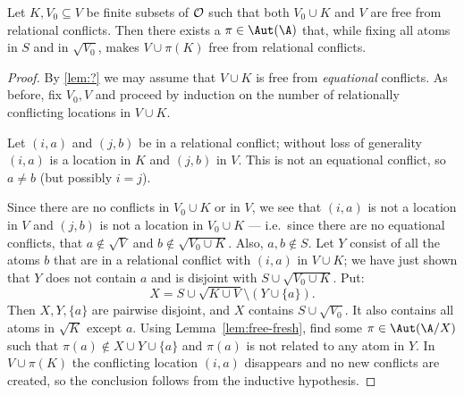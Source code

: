 \begin{lemma}\label{lem:!}
    Let $K, V_0 \subseteq V$ be finite subsets of $\cal O$ such that both $V_0\cup K$ and $V$ are free from relational conflicts. Then there exists a $\pi\in\Aut(\A)$ that, while fixing all atoms in $S$ and in $\sqrt{V_0}$, makes $V \cup \pi(K)$ free from relational conflicts.
\end{lemma}
\begin{proof}
    By \autoref{lem:?} we may assume that $V \cup K$ is free from {\em equational} conflicts.  As before, fix $V_0, V$ and proceed by induction on the number of relationally conflicting locations in $V \cup K$.
    
    Let $(i, a)$ and $(j, b)$ be in a relational conflict; without loss of generality $(i, a)$ is a location in $K$ and $(j, b)$ in $V$. This is not an equational conflict, so $a\neq b$ (but possibly $i=j$). 
    
    Since there are no conflicts in $V_0\cup K$ or in $V$, we see that $(i, a)$ is not a location in $V$ and $(j, b)$ is not a location in $V_0 \cup K$
    --- i.e.~since there are no equational conflicts, that $a\not\in \sqrt{V}$ and $b\not\in\sqrt{V_0\cup K}$.
    Also, $a,b\not\in S$.
    Let $Y$ consist of all the atoms $b$ that are in a relational conflict with $(i,a)$ in $V\cup K$; we have just shown that $Y$ does not contain $a$ and is disjoint with $S\cup\sqrt{V_0\cup K}$. Put:
    \[
        X = S \cup \sqrt{K \cup V} \setminus (Y \cup \{a\}).
    \]
    Then $X, Y, \{a\}$ are pairwise disjoint, and $X$ contains $S \cup \sqrt{V_0}$. It also contains all atoms in $\sqrt{K}$ except $a$.
   Using Lemma~\ref{lem:free-fresh}, find some $\pi\in \Aut(\A/X)$ such that $\pi(a) \not\in X \cup Y \cup \{a\}$ and $\pi(a)$ is not related to any atom in $Y$. In $V\cup\pi(K)$ the conflicting location $(i,a)$ disappears and no new conflicts are created, so the conclusion follows from the inductive hypothesis.
\end{proof}

